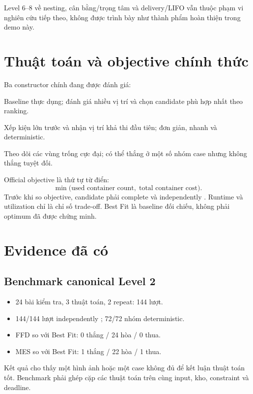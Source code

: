 \documentclass[12pt,a4paper]{article}
\newcommand{\code}[1]{\texttt{\detokenize{#1}}}
\begin{document}
Level 6--8 về nesting, cân bằng/trọng tâm và delivery/LIFO vẫn thuộc phạm vi nghiên cứu
tiếp theo, không được trình bày như thành phẩm hoàn thiện trong demo này.

\section{Thuật toán và objective chính thức}

Ba constructor chính đang được đánh giá:
\begin{description}[leftmargin=0pt,style=nextline]
  \item[Extreme Point Best Fit] Baseline thực dụng; đánh giá nhiều vị trí và chọn candidate
  phù hợp nhất theo ranking.
  \item[First Fit Decreasing (FFD)] Xếp kiện lớn trước và nhận vị trí khả thi đầu tiên;
  đơn giản, nhanh và deterministic.
  \item[Maximal Empty Spaces Best Fit (MES)] Theo dõi các vùng trống cực đại; có thể thắng
  ở một số nhóm case nhưng không thắng tuyệt đối.
\end{description}

Official objective là thứ tự từ điển:
\[
  \min\bigl(\text{used container count},\;\text{total container cost}\bigr).
\]
Trước khi so objective, candidate phải complete và independently \code{VALID}. Runtime và
utilization chỉ là chỉ số trade-off. Best Fit là baseline đối chiếu, không phải optimum đã
được chứng minh.

\section{Evidence đã có}

\subsection{Benchmark canonical Level 2}
\begin{itemize}[leftmargin=1.5em]
  \item 24 bài kiểm tra, 3 thuật toán, 2 repeat: 144 lượt.
  \item 144/144 lượt independently \code{VALID}; 72/72 nhóm deterministic.
  \item FFD so với Best Fit: 0 thắng / 24 hòa / 0 thua.
  \item MES so với Best Fit: 1 thắng / 22 hòa / 1 thua.
\end{itemize}

Kết quả cho thấy một hình ảnh hoặc một case không đủ để kết luận thuật toán tốt. Benchmark
phải ghép cặp các thuật toán trên cùng input, kho, constraint và deadline.
\end{document}
